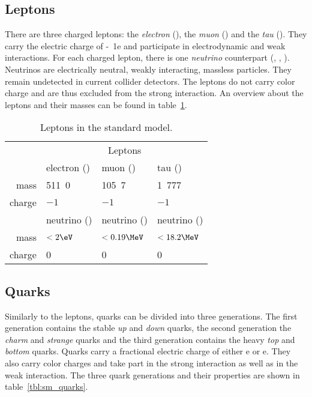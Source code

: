 \subsection{Leptons}
There are three charged leptons: the \emph{electron} (\Pe), the \emph{muon} (\Pmu) and the \emph{tau} (\Ptau). They carry the electric charge of \unit{-1}{e} and participate in electrodynamic and weak interactions. For each charged lepton, there is one \emph{neutrino} counterpart (\Pnue, \Pnum, \Pnut). Neutrinos are electrically neutral, weakly interacting, massless particles. They remain undetected in current collider detectors.
The leptons do not carry color charge and are thus excluded from the strong interaction.
An overview about the leptons and their masses can be found in table~\ref{tbl:sm_leptons}.

\begin{table}[htbp]
	\center
	\begin{tabular}{ r | l | l | l | }
		\cline{2-4}
		& \multicolumn{3}{c|}{Leptons} \\ \cline{2-4}
		& electron (\Pe) & muon (\Pmu) & tau (\Ptau) \\ \cline{2-4}
		mass & \unit{511.0}{\keV} & \unit{105.7}{\MeV} & \unit{1.777}{\GeV} \\ \cline{2-4}
		charge & $-1$ & $-1$ & $-1$ \\ \cline{2-4}
		& \Pe neutrino (\Pnue) & \Pmu neutrino (\Pnum) & \Ptau neutrino (\Pnut) \\ \cline{2-4}
		mass & $< \unit{2}{\eV}$ & $< \unit{0.19}{\MeV}$ & $< \unit{18.2}{\MeV}$ \\ \cline{2-4}
		charge & 0 & 0 & 0 \\ \cline{2-4}
	\end{tabular}
	\caption{Leptons in the standard model\cite[p.~30, p.~690f.]{Oo2014Review}.}
	\label{tbl:sm_leptons}
\end{table}

\subsection{Quarks}
Similarly to the leptons, quarks can be divided into three generations. The first generation contains the stable \emph{up} and \emph{down} quarks, the second generation the \emph{charm} and \emph{strange} quarks and the third generation contains the heavy \emph{top} and \emph{bottom} quarks. Quarks carry a fractional electric charge of either \unit{}{e} or \unit{}{e}.
They also carry color charges and take part in the strong interaction as well as in the weak interaction.
The three quark generations and their properties are shown in table~\ref{tbl:sm_quarks}.

